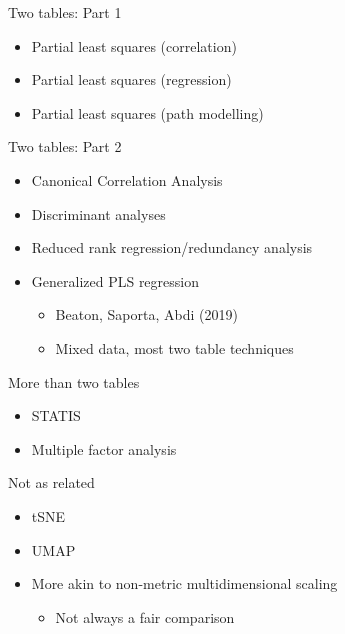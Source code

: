 \documentclass[
  ignorenonframetext,
]{beamer}
\providecommand{\tightlist}{%
  \setlength{\itemsep}{0pt}\setlength{\parskip}{0pt}}
\begin{document}
\begin{frame}{Two tables: Part 1}
\protect\hypertarget{two-tables-part-1}{}

\begin{itemize}[<+->]
\tightlist
\item
  Partial least squares (correlation)
\item
  Partial least squares (regression)
\item
  Partial least squares (path modelling)
\end{itemize}

\end{frame}

\begin{frame}{Two tables: Part 2}
\protect\hypertarget{two-tables-part-2}{}

\begin{itemize}[<+->]
\tightlist
\item
  Canonical Correlation Analysis
\item
  Discriminant analyses
\item
  Reduced rank regression/redundancy analysis
\item
  Generalized PLS regression

  \begin{itemize}[<+->]
  \tightlist
  \item
    Beaton, Saporta, Abdi (2019)
  \item
    Mixed data, most two table techniques
  \end{itemize}
\end{itemize}

\end{frame}

\begin{frame}{More than two tables}
\protect\hypertarget{more-than-two-tables}{}

\begin{itemize}[<+->]
\tightlist
\item
  STATIS
\item
  Multiple factor analysis
\end{itemize}

\end{frame}

\begin{frame}{Not as related}
\protect\hypertarget{not-as-related}{}

\begin{itemize}[<+->]
\tightlist
\item
  tSNE
\item
  UMAP
\item
  More akin to non-metric multidimensional scaling

  \begin{itemize}[<+->]
  \tightlist
  \item
    Not always a fair comparison
  \end{itemize}
\end{itemize}

\end{frame}
\end{document}
